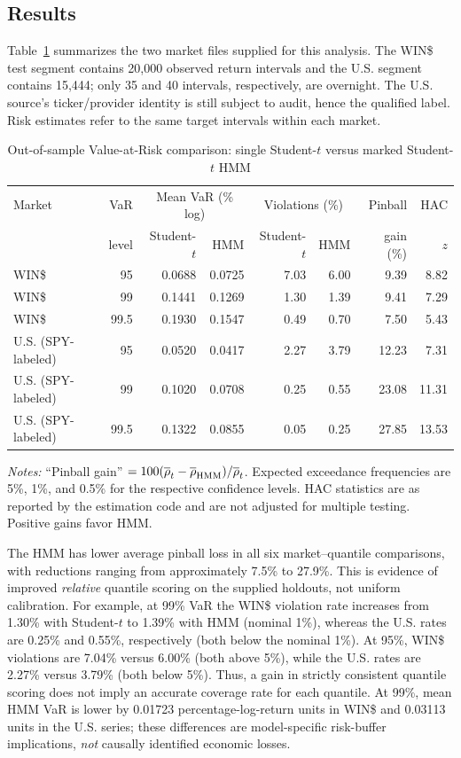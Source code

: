 \documentclass[11pt,a4paper]{article}
\begin{document}
\subsection{Results}\label{subsec:var_results}
Table~\ref{tab:var} summarizes the two market files supplied for this analysis. The WIN\$ test segment contains 20,000 observed return intervals and the U.S. segment contains 15,444; only 35 and 40 intervals, respectively, are overnight. The U.S. source's ticker/provider identity is still subject to audit, hence the qualified label. Risk estimates refer to the same target intervals within each market.
\begin{table}[htbp]\centering\small
\caption{Out-of-sample Value-at-Risk comparison: single Student-$t$ versus marked Student-$t$ HMM}\label{tab:var}
\setlength{\tabcolsep}{4pt}
\begin{tabular}{lrrrrrrr}\toprule
Market & VaR & \multicolumn{2}{c}{Mean VaR (\% log)} & \multicolumn{2}{c}{Violations (\%)} & Pinball & HAC\\
& level & Student-$t$ & HMM & Student-$t$ & HMM & gain (\%) & $z$\\\midrule
WIN\$ & 95 & 0.0688 & 0.0725 & 7.03 & 6.00 & 9.39 & 8.82 \\
WIN\$ & 99 & 0.1441 & 0.1269 & 1.30 & 1.39 & 9.41 & 7.29 \\
WIN\$ & 99.5 & 0.1930 & 0.1547 & 0.49 & 0.70 & 7.50 & 5.43 \\
U.S. (SPY-labeled) & 95 & 0.0520 & 0.0417 & 2.27 & 3.79 & 12.23 & 7.31 \\
U.S. (SPY-labeled) & 99 & 0.1020 & 0.0708 & 0.25 & 0.55 & 23.08 & 11.31 \\
U.S. (SPY-labeled) & 99.5 & 0.1322 & 0.0855 & 0.05 & 0.25 & 27.85 & 13.53 \\
\bottomrule\end{tabular}
\par\vspace{2pt}\footnotesize\emph{Notes:} ``Pinball gain'' $=100(\overline\rho_t-\overline\rho_{\rm HMM})/\overline\rho_t$. Expected exceedance frequencies are 5\%, 1\%, and 0.5\% for the respective confidence levels. HAC statistics are as reported by the estimation code and are not adjusted for multiple testing. Positive gains favor HMM.
\end{table}

The HMM has lower average pinball loss in all six market--quantile comparisons, with reductions ranging from approximately 7.5\% to 27.9\%. This is evidence of improved \emph{relative} quantile scoring on the supplied holdouts, not uniform calibration. For example, at 99\% VaR the WIN\$ violation rate increases from 1.30\% with Student-$t$ to 1.39\% with HMM (nominal 1\%), whereas the U.S. rates are 0.25\% and 0.55\%, respectively (both below the nominal 1\%). At 95\%, WIN\$ violations are 7.04\% versus 6.00\% (both above 5\%), while the U.S. rates are 2.27\% versus 3.79\% (both below 5\%). Thus, a gain in strictly consistent quantile scoring does not imply an accurate coverage rate for each quantile. At 99\%, mean HMM VaR is lower by 0.01723 percentage-log-return units in WIN\$ and 0.03113 units in the U.S. series; these differences are model-specific risk-buffer implications, \emph{not} causally identified economic losses.
\end{document}
